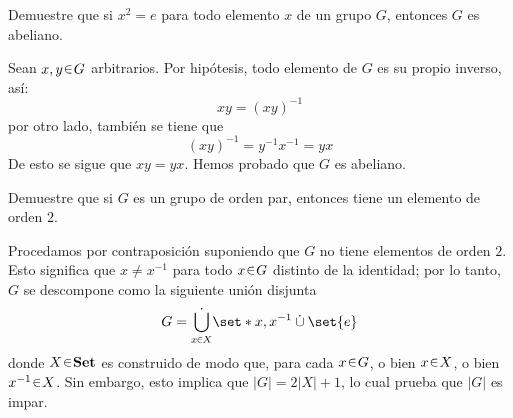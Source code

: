 \begin{ejer}
    Demuestre que si $x^2 = e$ para todo elemento $x$ de un grupo $G$, entonces $G$ es abeliano.
\end{ejer}
\begin{sol}
    Sean $x,y \en G$ arbitrarios. Por hipótesis, todo elemento de $G$ es su propio inverso, así:
    \[
        xy = (xy)^{-1}
    \]
    por otro lado, también se tiene que
    \[
        (xy)^{-1} = y^{-1}x^{-1}=yx
    \]
    De esto se sigue que $xy = yx$. Hemos probado que $G$ es abeliano.
\end{sol}


\begin{ejer}
    Demuestre que si $G$ es un grupo de orden par, entonces tiene un elemento de orden $2$.
\end{ejer}
\begin{sol}
    Procedamos por contraposición suponiendo que $G$ no tiene elementos de orden $2$. Esto significa que $x \neq x^{-1}$ para todo $x \en G$ distinto de la identidad; por lo tanto, $G$ se descompone como la siguiente unión disjunta
    \[
        G = \dot{\bigcup_{x \en X}} \set*{x,x^{-1}} \mathbin{\dot{\cup}} \set{e}
    \]
    donde $X \en \cat{Set}$ es construido de modo que, para cada $x \en G$, o bien $x \en X$, o bien $x^{-1} \en X$. Sin embargo, esto implica que $|G| = 2|X| + 1$, lo cual prueba que $|G|$ es impar. 
\end{sol}


